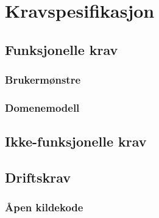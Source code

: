 \section{Kravspesifikasjon}

\subsection{Funksjonelle krav}
\subsubsection{Brukermønstre}
\subsubsection{Domenemodell}

\subsection{Ikke-funksjonelle krav}

\subsection{Driftskrav}

\subsubsection{Åpen kildekode}

